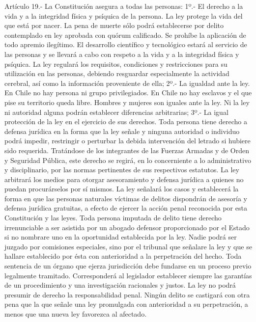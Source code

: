     Artículo 19.- La Constitución asegura a todas las personas:
    1º.- El derecho a la vida y a la integridad física y psíquica de la persona.
    La ley protege la vida del que está por nacer.
    La pena de muerte sólo podrá establecerse por delito contemplado en ley aprobada con quórum calificado.
    Se prohíbe la aplicación de todo apremio ilegítimo.
    El desarrollo científico y tecnológico estará al servicio de las personas y se llevará a cabo con respeto a la vida y a la integridad física y psíquica. La ley regulará los requisitos, condiciones y restricciones para su utilización en las personas, debiendo resguardar especialmente la actividad cerebral, así como la información proveniente de ella;
    2º.- La igualdad ante la ley. En Chile no hay persona ni grupo privilegiados. En Chile no hay esclavos y el que pise su territorio queda libre. Hombres y mujeres son iguales ante la ley.
    Ni la ley ni autoridad alguna podrán establecer diferencias arbitrarias;
    3º.- La igual protección de la ley en el ejercicio de sus derechos.
    Toda persona tiene derecho a defensa jurídica en la forma que la ley señale y ninguna autoridad o individuo podrá impedir, restringir o perturbar la debida intervención del letrado si hubiere sido requerida. Tratándose de los integrantes de las Fuerzas Armadas y de Orden y Seguridad Pública, este derecho se regirá, en lo concerniente a lo administrativo y disciplinario, por las normas pertinentes de sus respectivos estatutos.
    La ley arbitrará los medios para otorgar asesoramiento y defensa jurídica a quienes no puedan procurárselos por sí mismos. La ley señalará los casos y establecerá la forma en que las personas naturales víctimas de delitos dispondrán de asesoría y defensa jurídica gratuitas, a efecto de ejercer la acción penal reconocida por esta Constitución y las leyes.
    Toda persona imputada de delito tiene derecho irrenunciable a ser asistida por un abogado defensor proporcionado por el Estado si no nombrare uno en la oportunidad establecida por la ley.
    Nadie podrá ser juzgado por comisiones especiales, sino por el tribunal que señalare la ley y que se hallare establecido por ésta con anterioridad a la perpetración del hecho.
    Toda sentencia de un órgano que ejerza jurisdicción debe fundarse en un proceso previo legalmente tramitado. Corresponderá al legislador establecer siempre las garantías de un procedimiento y una investigación racionales y justos.
    La ley no podrá presumir de derecho la responsabilidad penal.
    Ningún delito se castigará con otra pena que la que señale una ley promulgada con anterioridad a su perpetración, a menos que una nueva ley favorezca al afectado.
